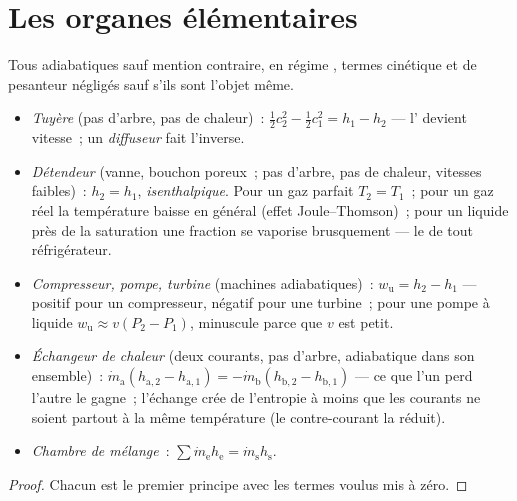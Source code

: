 \section{Les organes élémentaires}

\begin{proposition}\label{prop:b2:open-systems:devices}
Tous adiabatiques sauf mention contraire, en régime , termes cinétique et de pesanteur
négligés sauf s'ils sont l'objet même.
\begin{itemize}
\item \emph{Tuyère} (pas d'arbre, pas de chaleur)~: $\tfrac12c_2^2 -
      \tfrac12c_1^2 = h_1 - h_2$ --- l' devient vitesse~; un
      \emph{diffuseur} fait l'inverse.
\item \emph{Détendeur} (vanne, bouchon poreux~; pas d'arbre,
      pas de chaleur, vitesses faibles)~: $h_2 = h_1$, \emph{isenthalpique}. Pour un
      gaz parfait $T_2 = T_1$~; pour un gaz réel la température baisse en général
      (effet Joule--Thomson)~; pour un liquide près de la saturation une
      fraction se vaporise brusquement --- le  de tout réfrigérateur.
\item \emph{Compresseur, pompe, turbine} (machines
      adiabatiques)~: $w_{\text{u}} = h_2 - h_1$ --- positif pour un compresseur,
      négatif pour une turbine~; pour une pompe à liquide $w_{\text{u}} \approx
      v(P_2 - P_1)$, minuscule parce que $v$ est petit.
\item \emph{Échangeur de chaleur} (deux courants, pas
      d'arbre, adiabatique dans son ensemble)~: $\dot m_{\text{a}}(h_{\text{a},2} -
      h_{\text{a},1}) = -\dot m_{\text{b}}(h_{\text{b},2} - h_{\text{b},1})$
      --- ce que l'un perd l'autre le gagne~; l'échange crée de l'entropie
      à moins que les courants ne soient partout à la même température
      (le contre-courant la réduit).
\item \emph{Chambre de mélange}~: $\sum\dot m_{\text{e}}h_{\text{e}} = \dot
      m_{\text{s}}h_{\text{s}}$.
\end{itemize}
\end{proposition}

\begin{proof}
Chacun est le premier principe avec les termes voulus mis à zéro.
\end{proof}

